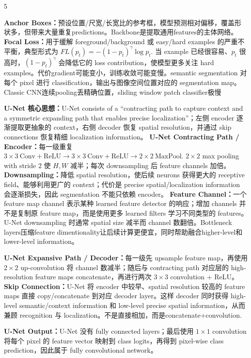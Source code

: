 \documentclass[a4paper, landscape]{article}
\begin{document}
\begin{multicols}{5}
\par \textbf{Anchor Boxes：}预设位置/尺宽/长宽比的参考框，模型预测相对偏移，覆盖形状多，但带来大量重复predictions。Backbone是提取通用features的主体网络。 \textbf{Focal Loss：}用于缓解 foreground/background 或 easy/hard examples 的严重不平衡，典型形式为
\(
FL(p_t)=-(1-p_t)^\gamma\log p_t.
\)
当 example 已经很容易、\(p_t\) 很高时，\((1-p_t)^\gamma\) 会降低它的 loss contribution，使模型更多关注 hard examples。代价gradient可能变小，训练收敛可能变慢。semantic segmentation 对每个 pixel 进行 classification，输出与图像空间位置对应的 segmentation map。Classic CNN连续pooling丢精确位置，sliding window patch classifier极慢

\par \textbf{U-Net 核心思想：}U-Net consists of a ``contracting path to capture context and a symmetric expanding path that enables precise localization''；左侧 encoder 逐渐提取更抽象的 context，右侧 decoder 恢复 spatial resolution，并通过 skip connections 恢复精细 localization information。
\textbf{U-Net Contracting Path / Encoder：}每一级重复
\(
3\times3\ \mathrm{Conv}+\mathrm{ReLU}
\rightarrow
3\times3\ \mathrm{Conv}+\mathrm{ReLU}
\rightarrow
2\times2\ \mathrm{MaxPool}.
\)
\(2\times2\) max pooling with stride \(2\) 使 \(H,W\) 减半；每次 downsampling 后 feature channels 加倍。
\textbf{Downsampling：}降低 spatial resolution，使后续 neurons 获得更大的 receptive field、能够利用更广的 context；代价是 precise spatial/localization information 会逐渐损失，因此 segmentation 不能只依赖 encoder。
\textbf{Feature Channel：}一个 feature map channel 表示某种 learned feature detector 的响应；增加 channels 并不是复制原 feature map，而是使用更多 learned filters 学习不同类型的 features。U-Net downsampling 时通常 spatial size 减半而 channel 数翻倍。Bottleneck layers压缩feature dimentionality让后续计算更便宜，同时帮助融合higher-level和lower-level information。

\par \textbf{U-Net Expansive Path / Decoder：}每一级先 upsample feature map，再使用 \(2\times2\) up-convolution 将 channel 数减半；随后与 contracting path 对应层的 high-resolution feature maps concatenate，再进行两次 \(3\times3\) convolution + ReLU。
\textbf{Skip Connection：}U-Net 将 encoder 中较早、spatial resolution 较高的 feature maps 直接 copy/concatenate 到对应 decoder layer。这样 decoder 同时获得 high-level semantic/context information 和 low-level precise spatial information，从而兼顾 recognition 与 localization。不是直接相加，而是concatenate+convolution.

\par \textbf{U-Net Output：}U-Net 没有 fully connected layers；最后使用 \(1\times1\) convolution 将每个 pixel 的 feature vector 映射到 class logits，再得到 pixel-wise class prediction，因此属于 fully convolutional network。


\end{multicols}
\end{document}
